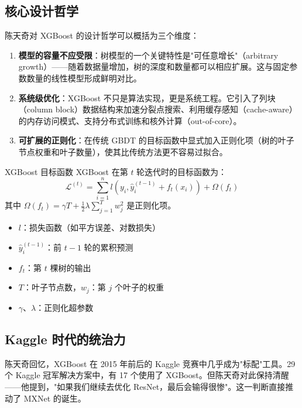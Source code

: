 \documentclass[a4paper]{article}
\begin{document}
\subsection{核心设计哲学}

陈天奇对 XGBoost 的设计哲学可以概括为三个维度：

\begin{enumerate}
\item \textbf{模型的容量不应受限}：树模型的一个关键特性是"可任意增长"（arbitrary growth）——随着数据量增加，树的深度和数量都可以相应扩展。这与固定参数数量的线性模型形成鲜明对比。

\item \textbf{系统级优化}：XGBoost 不只是算法实现，更是系统工程。它引入了列块（column block）数据结构来加速分裂点搜索、利用缓存感知（cache-aware）的内存访问模式、支持分布式训练和核外计算（out-of-core）。

\item \textbf{可扩展的正则化}：在传统 GBDT 的目标函数中显式加入正则化项（树的叶子节点权重和叶子数量），使其比传统方法更不容易过拟合。
\end{enumerate}

\begin{importantbox}{XGBoost 目标函数}
XGBoost 在第 $t$ 轮迭代时的目标函数为：
$$
\mathcal{L}^{(t)} = \sum_{i=1}^{n} l(y_i, \hat{y}_i^{(t-1)} + f_t(x_i)) + \Omega(f_t)
$$
其中 $\Omega(f_t) = \gamma T + \frac{1}{2}\lambda \sum_{j=1}^{T} w_j^2$ 是正则化项。
\begin{itemize}
\item $l$：损失函数（如平方误差、对数损失）
\item $\hat{y}_i^{(t-1)}$：前 $t-1$ 轮的累积预测
\item $f_t$：第 $t$ 棵树的输出
\item $T$：叶子节点数，$w_j$：第 $j$ 个叶子的权重
\item $\gamma$、$\lambda$：正则化超参数
\end{itemize}
\end{importantbox}

\subsection{Kaggle 时代的统治力}

陈天奇回忆，XGBoost 在 2015 年前后的 Kaggle 竞赛中几乎成为"标配"工具。29 个 Kaggle 冠军解决方案中，有 17 个使用了 XGBoost。但陈天奇对此保持清醒——他提到，"如果我们继续去优化 ResNet，最后会输得很惨"。这一判断直接推动了 MXNet 的诞生。
\end{document}
